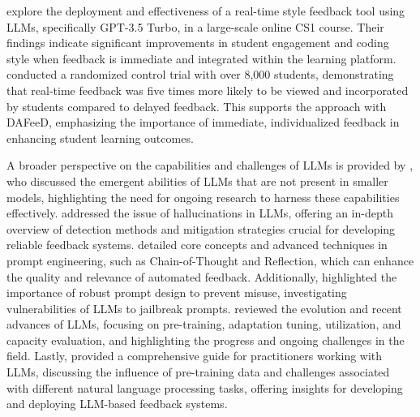 \documentclass[sigconf,screen,review,anonymous]{acmart}
\begin{document}
\citet{woodrow:2024:AITeachesArt} explore the deployment and effectiveness of a real-time style feedback tool using LLMs, specifically GPT-3.5 Turbo, in a large-scale online CS1 course.
Their findings indicate significant improvements in student engagement and coding style when feedback is immediate and integrated within the learning platform.
\citeauthor{woodrow:2024:AITeachesArt} conducted a randomized control trial with over 8,000 students, demonstrating that real-time feedback was five times more likely to be viewed and incorporated by students compared to delayed feedback.
This supports the approach with DAFeeD, emphasizing the importance of immediate, individualized feedback in enhancing student learning outcomes.

A broader perspective on the capabilities and challenges of LLMs is provided by \citet{wei:2022:EmergentAbilitiesLarge}, who discussed the emergent abilities of LLMs that are not present in smaller models, highlighting the need for ongoing research to harness these capabilities effectively.
\citet{huang:2023:SurveyHallucinationLargeb} addressed the issue of hallucinations in LLMs, offering an in-depth overview of detection methods and mitigation strategies crucial for developing reliable feedback systems.
\citet{amatriain:2024:PromptDesignEngineering} detailed core concepts and advanced techniques in prompt engineering, such as Chain-of-Thought and Reflection, which can enhance the quality and relevance of automated feedback.
Additionally, \citet{liu:2024:JailbreakingChatGPTPrompt} highlighted the importance of robust prompt design to prevent misuse, investigating vulnerabilities of LLMs to jailbreak prompts.
\citet{zhao:2023:SurveyLargeLanguage} reviewed the evolution and recent advances of LLMs, focusing on pre-training, adaptation tuning, utilization, and capacity evaluation, and highlighting the progress and ongoing challenges in the field.
Lastly, \citet{yang:2024:HarnessingPowerLLMs} provided a comprehensive guide for practitioners working with LLMs, discussing the influence of pre-training data and challenges associated with different natural language processing tasks, offering insights for developing and deploying LLM-based feedback systems.
\end{document}
